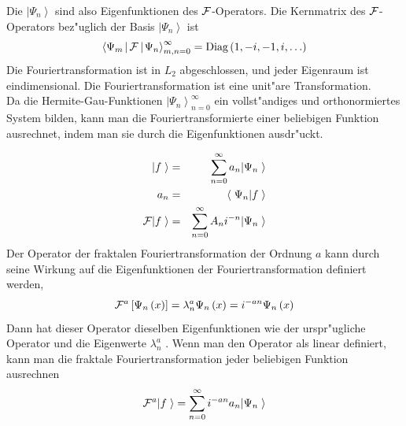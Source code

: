 \documentclass[11pt,twoside]{report}
\begin{document}
Die $|\Psi_n\left.\right>$ sind also Eigenfunktionen des ${\cal F}$-Operators. Die Kernmatrix des ${\cal F}$-Operators bez"uglich der Basis $|\Psi_n\left.\right>$ ist
$$ \left< \Psi_m \right. \!| \, {\cal F} \, |\! \left. \Psi_n \right>_{m,n=0}^{\infty} = \mbox{Diag}\left(1,-i,-1,i,\ldots\right)$$
Die Fouriertransformation ist in $L_2$ abgeschlossen, und jeder Eigenraum ist eindimensional. Die Fouriertransformation ist eine unit"are Transformation.\\
Da die Hermite-Gau\3-Funktionen $|\Psi_n\left.\right>_{n=0}^{\infty}$ ein vollst"andiges und orthonormiertes System bilden, kann man die Fouriertransformierte einer beliebigen Funktion ausrechnet, indem man sie durch die Eigenfunktionen ausdr"uckt.

\begin{eqnarray*}
  |f\left. \right> & = & \sum_{n=0}^{\infty}a_n |\Psi_n \left. \right> \\ 
  a_n & = & \left< \right. \Psi_n | f \left. \right> \\
  {\cal F}|f \left. \right> & = & \sum_{n=0}^{\infty}A_n i^{-n} |\Psi_n \left. \right> 
\end{eqnarray*}
Der Operator der fraktalen Fouriertransformation der Ordnung $a$ kann durch seine Wirkung auf die Eigenfunktionen der Fouriertransformation definiert werden,
$${\cal F}^a \left[{\Psi}_n \left( x \right)\right] = {\lambda}_n^{a} \Psi_n \left( x\right)=i^{-an}\Psi _n\left( x\right) $$ 
Dann hat dieser Operator dieselben Eigenfunktionen wie der urspr"ugliche 
Operator und die Eigenwerte $\lambda_n^{a}$ . Wenn man den Operator als  
linear definiert, kann man die fraktale Fouriertransformation jeder 
beliebigen Funktion ausrechnen
$$ {\cal F}^{a}| f\left. \right>  = \sum_{n=0}^{\infty}i^{-an}a_n |\Psi _n \left. \right> $$
\end{document}
